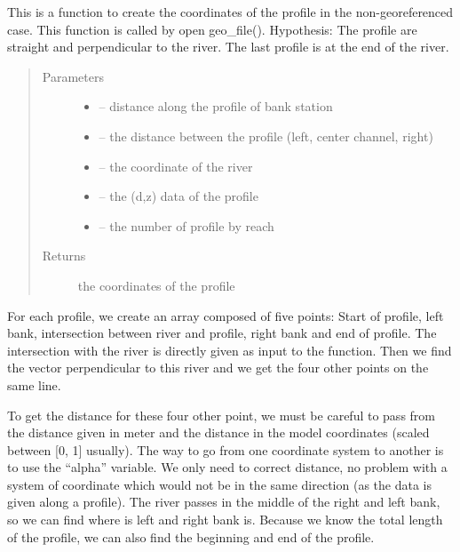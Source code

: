 \documentclass[letterpaper,10pt,english]{sphinxmanual}
\begin{document}
\begin{fulllineitems}
\label{\detokenize{index:src.Hec_ras06.coord_profile_non_georeferenced}}
This is a function to create the coordinates of the profile in the non-georeferenced case.
This function is called by open geo\_file(). Hypothesis: The profile are straight and perpendicular to the river.
The last profile is at the end of the river.
\begin{quote}\begin{description}
\item[{Parameters}] \leavevmode\begin{itemize}
\item {} 
 -- distance along the profile of bank station

\item {} 
 -- the distance between the profile (left, center channel, right)

\item {} 
 -- the coordinate of the river

\item {} 
 -- the (d,z) data of the profile

\item {} 
 -- the number of profile by reach

\end{itemize}

\item[{Returns}] \leavevmode
the coordinates of the profile

\end{description}\end{quote}


For each profile, we create an array composed of five points: Start of profile, left bank, intersection between
river and profile, right bank and end of profile. The intersection with the river is directly given as input to
the function. Then we find the vector perpendicular to this river and we get the four other points on the same line.

To get the distance for these four other point, we must be careful to pass from the distance given in meter and the
distance in the model coordinates (scaled between {[}0, 1{]} usually). The way to go from one coordinate system to
another is to use the “alpha” variable.  We only need to correct distance, no problem with a system of coordinate
which would not be in the same direction (as the data is given along a profile). The river passes in the middle of
the right and left bank, so we can find where is left and right bank is. Because we know the total length of the
profile, we can also find the beginning and end of the profile.

\end{fulllineitems}
\end{document}

